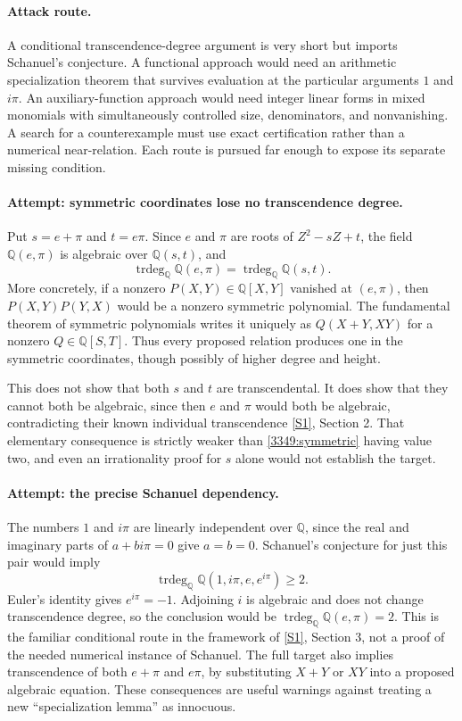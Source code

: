 \documentclass[11pt,a4paper]{article}
\newcommand{\Q}{\mathbb{Q}}
\newcommand{\sref}[2]{\hyperlink{source:#1:#2}{[S#2]}}
\numberwithin{equation}{section}
\begin{document}
\paragraph{Attack route.}
A conditional transcendence-degree argument is very short but imports
Schanuel's conjecture. A functional approach would need an arithmetic
specialization theorem that survives evaluation at the particular
arguments $1$ and $i\pi$. An auxiliary-function approach would need
integer linear forms in mixed monomials with simultaneously controlled
size, denominators, and nonvanishing. A search for a counterexample must
use exact certification rather than a numerical near-relation. Each
route is pursued far enough to expose its separate missing condition.

\paragraph{Attempt: symmetric coordinates lose no transcendence degree.}
Put $s=e+\pi$ and $t=e\pi$. Since $e$ and $\pi$ are roots of
$Z^2-sZ+t$, the field $\Q(e,\pi)$ is algebraic over $\Q(s,t)$, and
\begin{equation}\label{3349:symmetric}
 \operatorname{trdeg}_{\Q}\Q(e,\pi)
 =\operatorname{trdeg}_{\Q}\Q(s,t).
\end{equation}
More concretely, if a nonzero $P(X,Y)\in\Q[X,Y]$ vanished at $(e,\pi)$,
then $P(X,Y)P(Y,X)$ would be a nonzero symmetric polynomial. The
fundamental theorem of symmetric polynomials writes it uniquely as
$Q(X+Y,XY)$ for a nonzero $Q\in\Q[S,T]$. Thus every proposed relation
produces one in the symmetric coordinates, though possibly of higher
degree and height.

This does not show that both $s$ and $t$ are transcendental. It does
show that they cannot both be algebraic, since then $e$ and $\pi$ would
both be algebraic, contradicting their known individual transcendence
\sref{3349}{1}, Section 2. That elementary consequence is strictly weaker
than \eqref{3349:symmetric} having value two, and even an irrationality
proof for $s$ alone would not establish the target.

\paragraph{Attempt: the precise Schanuel dependency.}
The numbers $1$ and $i\pi$ are linearly independent over $\Q$, since
the real and imaginary parts of $a+bi\pi=0$ give $a=b=0$. Schanuel's
conjecture for just this pair would imply
\begin{equation}
 \operatorname{trdeg}_{\Q}\Q(1,i\pi,e,e^{i\pi})\geq2.
\end{equation}
Euler's identity gives $e^{i\pi}=-1$. Adjoining $i$ is algebraic and
does not change transcendence degree, so the conclusion would be
$\operatorname{trdeg}_{\Q}\Q(e,\pi)=2$. This is the familiar conditional
route in the framework of \sref{3349}{1}, Section 3, not a proof of the
needed numerical instance of Schanuel. The full target also implies
transcendence of both $e+\pi$ and $e\pi$, by substituting $X+Y$ or $XY$
into a proposed algebraic equation. These consequences are useful
warnings against treating a new ``specialization lemma'' as innocuous.
\end{document}
